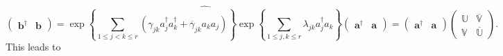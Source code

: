 \documentclass[aps, preprint]{revtex4}
\begin{document}
\begin{equation}\left (\begin{array}{cc}\mathbf{b}^{ \dag } & \mathbf{b}\end{array}\right ) =\widehat{\exp  \left \{\sum _{1 \leq j <k \leq r}\left (\gamma _{j k} a_{j}^{ \dag } a_{k}^{ \dag } +\overline{\gamma }_{j k} a_{k} a_{j}\right )\right \} \exp  \left \{\sum _{1 \leq j ,k \leq r}\lambda _{j k} a_{j}^{ \dag } a_{k}\right \}} \left (\begin{array}{cc}\mathbf{a}^{ \dag } & \mathbf{a}\end{array}\right ) =\left (\begin{array}{cc}\mathbf{a}^{ \dag } & \mathbf{a}\end{array}\right ) \left (\begin{array}{cc}\mathbb{U} & \overline{\mathbb{V}} \\
\mathbb{V} & \overline{\mathbb{U}}\end{array}\right )\text{.}
\end{equation}This leads to
\end{document}
